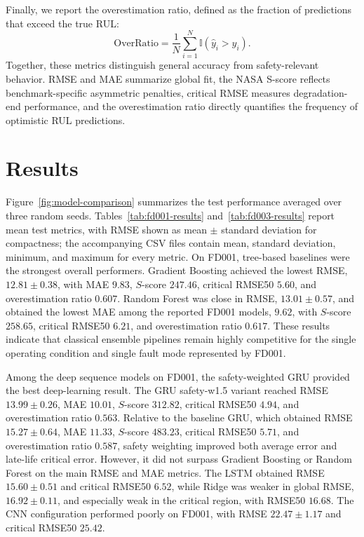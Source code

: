 \documentclass[11pt,a4paper]{article}
\begin{document}
Finally, we report the overestimation ratio, defined as the fraction of predictions that exceed the true RUL:
\begin{equation}
\mathrm{OverRatio}
=
\frac{1}{N}
\sum_{i=1}^{N}
\mathbb{I}(\hat{y}_i > y_i).
\end{equation}
Together, these metrics distinguish general accuracy from safety-relevant behavior. RMSE and MAE summarize global fit, the NASA S-score reflects benchmark-specific asymmetric penalties, critical RMSE measures degradation-end performance, and the overestimation ratio directly quantifies the frequency of optimistic RUL predictions.

\section{Results}

Figure~\ref{fig:model-comparison} summarizes the test performance averaged over three random seeds. Tables~\ref{tab:fd001-results} and~\ref{tab:fd003-results} report mean test metrics, with RMSE shown as mean \(\pm\) standard deviation for compactness; the accompanying CSV files contain mean, standard deviation, minimum, and maximum for every metric. On FD001, tree-based baselines were the strongest overall performers. Gradient Boosting achieved the lowest RMSE, \(12.81 \pm 0.38\), with MAE \(9.83\), \(\textit{S}\)-score \(247.46\), critical RMSE50 \(5.60\), and overestimation ratio \(0.607\). Random Forest was close in RMSE, \(13.01 \pm 0.57\), and obtained the lowest MAE among the reported FD001 models, \(9.62\), with \(\textit{S}\)-score \(258.65\), critical RMSE50 \(6.21\), and overestimation ratio \(0.617\). These results indicate that classical ensemble pipelines remain highly competitive for the single operating condition and single fault mode represented by FD001.

Among the deep sequence models on FD001, the safety-weighted GRU provided the best deep-learning result. The GRU safety-w1.5 variant reached RMSE \(13.99 \pm 0.26\), MAE \(10.01\), \(\textit{S}\)-score \(312.82\), critical RMSE50 \(4.94\), and overestimation ratio \(0.563\). Relative to the baseline GRU, which obtained RMSE \(15.27 \pm 0.64\), MAE \(11.33\), \(\textit{S}\)-score \(483.23\), critical RMSE50 \(5.71\), and overestimation ratio \(0.587\), safety weighting improved both average error and late-life critical error. However, it did not surpass Gradient Boosting or Random Forest on the main RMSE and MAE metrics. The LSTM obtained RMSE \(15.60 \pm 0.51\) and critical RMSE50 \(6.52\), while Ridge was weaker in global RMSE, \(16.92 \pm 0.11\), and especially weak in the critical region, with RMSE50 \(16.68\). The CNN configuration performed poorly on FD001, with RMSE \(22.47 \pm 1.17\) and critical RMSE50 \(25.42\).
\end{document}
